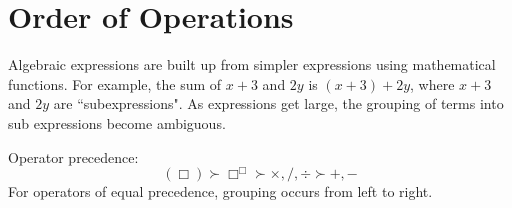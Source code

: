 \documentclass{article}
\begin{document}
%



\section{Order of Operations}

Algebraic expressions are built up from simpler expressions using mathematical functions. For example, the sum of \(x + 3\) and \(2y\) is \((x + 3) + 2y\), where \(x + 3\) and \(2y\) are ``subexpressions". As expressions get large, the grouping of terms into sub expressions become ambiguous.

Operator precedence:
\[(\Box) \succ  \Box^\Box \succ \times,/,\div \succ +,-\] 
For operators of equal precedence, grouping occurs from left to right. 
\end{document}
